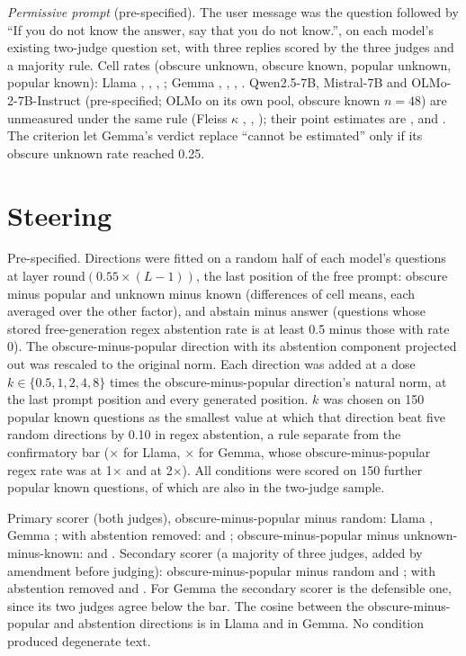 \documentclass[manuscript,screen,review,anonymous,nonacm]{acmart}
\begin{document}
\emph{Permissive prompt} (pre-specified). The user message was the question followed by ``If you do not know the answer, say that you do not know.'', on each model's existing two-judge question set, with three replies scored by the three judges and a majority rule. Cell rates (obscure unknown, obscure known, popular unknown, popular known): Llama \pmLlamaObsUnk, \pmLlamaObsKnown, \pmLlamaPopUnk, \pmLlamaPopKnown; Gemma \pmGemmaObsUnk, \pmGemmaObsKnown, \pmGemmaPopUnk, \pmGemmaPopKnown. Qwen2.5-7B, Mistral-7B and OLMo-2-7B-Instruct (pre-specified; OLMo on its own pool, obscure known $n=48$) are unmeasured under the same rule (Fleiss $\kappa$ \pmQwenKappa, \pmMistralKappa, \pmOlmoKappa); their point estimates are \pmQwenDiff{} \pmQwenDiffCI, \pmMistralDiff{} \pmMistralDiffCI{} and \pmOlmoDiff{} \pmOlmoDiffCI. The criterion let Gemma's verdict replace ``cannot be estimated'' only if its obscure unknown rate reached 0.25.

\section{Steering}
\label{app:steer}

Pre-specified. Directions were fitted on a random half of each model's questions at layer round$(0.55\times(L-1))$, the last position of the free prompt: obscure minus popular and unknown minus known (differences of cell means, each averaged over the other factor), and abstain minus answer (questions whose stored free-generation regex abstention rate is at least 0.5 minus those with rate 0). The obscure-minus-popular direction with its abstention component projected out was rescaled to the original norm. Each direction was added at a dose $k\in\{0.5,1,2,4,8\}$ times the obscure-minus-popular direction's natural norm, at the last prompt position and every generated position. $k$ was chosen on 150 popular known questions as the smallest value at which that direction beat five random directions by 0.10 in regex abstention, a rule separate from the confirmatory bar (\svLlamaDose$\times$ for Llama, \svGemmaDose$\times$ for Gemma, whose obscure-minus-popular regex rate was \svGemmaSelOne{} at 1$\times$ and \svGemmaSelTwo{} at 2$\times$). All conditions were scored on 150 further popular known questions, \lkSteerOverlap{} of which are also in the two-judge sample.

Primary scorer (both judges), obscure-minus-popular minus random: Llama \svLlamaDOne{} \svLlamaDOneCI, Gemma \svGemmaDOne{} \svGemmaDOneCI; with abstention removed: \svLlamaDTwo{} \svLlamaDTwoCI{} and \svGemmaDTwo{} \svGemmaDTwoCI; obscure-minus-popular minus unknown-minus-known: \svLlamaDThree{} \svLlamaDThreeCI{} and \svGemmaDThree{} \svGemmaDThreeCI. Secondary scorer (a majority of three judges, added by amendment before judging): obscure-minus-popular minus random \svLlamaMajDOne{} \svLlamaMajDOneCI{} and \svGemmaMajDOne{} \svGemmaMajDOneCI; with abstention removed \svLlamaMajDTwo{} \svLlamaMajDTwoCI{} and \svGemmaMajDTwo{} \svGemmaMajDTwoCI. For Gemma the secondary scorer is the defensible one, since its two judges agree below the bar. The cosine between the obscure-minus-popular and abstention directions is \svLlamaCos{} in Llama and \svGemmaCos{} in Gemma. No condition produced degenerate text.
\end{document}
